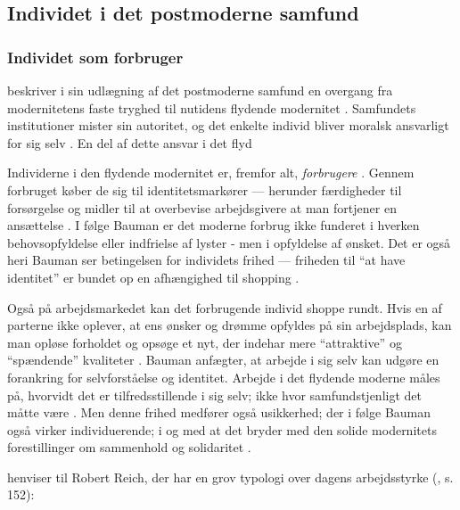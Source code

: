 \subsection{Individet i det postmoderne samfund}

\subsubsection{Individet som forbruger}
\citeauthor{baumanLiquidModernity2000} beskriver i sin udlægning af det postmoderne samfund en overgang fra modernitetens faste tryghed til nutidens flydende modernitet \autocite[s. 2]{baumanLiquidModernity2000}.
Samfundets institutioner mister sin autoritet, og det enkelte individ bliver moralsk ansvarligt for sig selv \autocite[s. 64ff]{baumanLiquidModernity2000}.
En del af dette ansvar i det flyd

Individerne i den flydende modernitet er, fremfor alt, \textit{forbrugere} \autocite[s 73ff; s. 76]{baumanLiquidModernity2000}.
Gennem forbruget køber de sig til identitetsmarkører --- herunder færdigheder til forsørgelse og midler til at overbevise arbejdsgivere at man fortjener en ansættelse \autocite[s. 74]{baumanLiquidModernity2000}.
I følge Bauman er det moderne forbrug ikke funderet i hverken behovsopfyldelse eller indfrielse af lyster - men i opfyldelse af ønsket.
Det er også heri Bauman ser betingelsen for individets frihed --- friheden til “at have identitet” er bundet op en afhængighed til shopping \autocite[s. 84]{baumanLiquidModernity2000}.

Også på arbejdsmarkedet kan det forbrugende individ shoppe rundt.
Hvis en af parterne ikke oplever, at ens ønsker og drømme opfyldes på sin arbejdsplads, kan man opløse forholdet og opsøge et nyt, der indehar mere “attraktive” og “spændende” kvaliteter \autocite[s. 169]{kofodOrganisationOgLedelse2016}.
Bauman anfægter, at arbejde i sig selv kan udgøre en forankring for selvforståelse og identitet.
Arbejde i det flydende moderne måles på, hvorvidt det er tilfredsstillende i sig selv; ikke hvor samfundstjenligt det måtte være \autocite[s. 139; 163f]{baumanLiquidModernity2000}.
Men denne frihed medfører også usikkerhed; der i følge Bauman også virker individuerende; i og med at det bryder med den solide modernitets forestillinger om sammenhold og solidaritet \autocite[s. 148]{baumanLiquidModernity2000}.

\citeauthor{baumanLiquidModernity2000} henviser til Robert Reich, der har en grov typologi over dagens arbejdsstyrke (\citeyear{baumanLiquidModernity2000}, s. 152):

